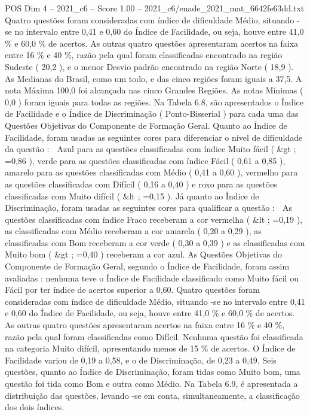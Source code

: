 \begin{textsample}{POS Dim 4 – 2021\_c6 – Score 1.00 – 2021\_c6/enade\_2021\_mat\_6642fe63dd.txt}
Quatro questões foram consideradas com índice de dificuldade Médio, situando -se no intervalo entre 0,41 e 0,60 do Índice de Facilidade, ou seja, houve entre 41,0 \% e 60,0 \% de acertos.
As outras quatro questões apresentaram acertos na faixa entre 16 \% e 40 \%, razão pela qual foram classificadas encontrado na região Sudeste ( 20,2 ), e o menor Desvio padrão encontrado na região Norte ( 18,9 ).
As Medianas do Brasil, como um todo, e das cinco regiões foram iguais a 37,5.
A nota Máxima 100,0 foi alcançada nas cinco Grandes Regiões.
As notas Mínimas ( 0,0 ) foram iguais para todas as regiões.
Na Tabela 6.8, são apresentados o Índice de Facilidade e o Índice de Discriminação ( Ponto-Bisserial ) para cada uma das Questões Objetivas do Componente de Formação Geral.
Quanto ao Índice de Facilidade, foram usadas as seguintes cores para diferenciar o nível de dificuldade da questão :  Azul para as questões classificadas com índice Muito fácil ( \&gt ; =0,86 ), verde para as questões classificadas com índice Fácil ( 0,61 a 0,85 ), amarelo para as questões classificadas com Médio ( 0,41 a 0,60 ), vermelho para as questões classificadas com Difícil ( 0,16 a 0,40 ) e roxo para as questões classificadas com Muito difícil ( \&lt ; =0,15 ).
Já quanto ao Índice de Discriminação, foram usadas as seguintes cores para qualificar a questão :  As questões classificadas com índice Fraco receberam a cor vermelha ( \&lt ; =0,19 ), as classificadas com Médio receberam a cor amarela ( 0,20 a 0,29 ), as classificadas com Bom receberam a cor verde ( 0,30 a 0,39 ) e as classificadas com Muito bom ( \&gt ; =0,40 ) receberam a cor azul.
As Questões Objetivas do Componente de Formação Geral, segundo o Índice de Facilidade, foram assim avaliadas : nenhuma teve o Índice de Facilidade classificado como Muito fácil ou Fácil por ter índice de acertos superior a 0,60.
Quatro questões foram consideradas com índice de dificuldade Médio, situando -se no intervalo entre 0,41 e 0,60 do Índice de Facilidade, ou seja, houve entre 41,0 \% e 60,0 \% de acertos.
As outras quatro questões apresentaram acertos na faixa entre 16 \% e 40 \%, razão pela qual foram classificadas como Difícil.
Nenhuma questão foi classificada na categoria Muito difícil, apresentando menos de 15 \% de acertos.
O Índice de Facilidade variou de 0,19 a 0,58, e o de Discriminação, de 0,23 a 0,49.
Seis questões, quanto ao Índice de Discriminação, foram tidas como Muito bom, uma questão foi tida como Bom e outra como Médio.
Na Tabela 6.9, é apresentada a distribuição das questões, levando -se em conta, simultaneamente, a classificação dos dois índices.

\end{textsample}
